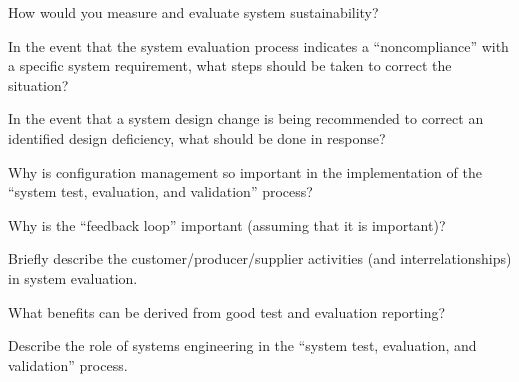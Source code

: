 \begin{exercises}
    \begin{exercise}
    \label{sea-06-13}
        How would you measure and evaluate system sustainability?
    \end{exercise}
    \begin{solution}
    \end{solution}
    
    \begin{exercise}
    \label{sea-06-14}
        In the event that the system evaluation process indicates a “noncompliance” with a specific system requirement, what steps should be taken to correct the situation?
    \end{exercise}
    \begin{solution}
    \end{solution}
    
    \begin{exercise}
    \label{sea-06-15}
        In the event that a system design change is being recommended to correct an identified design deficiency, what should be done in response?
    \end{exercise}
    \begin{solution}
    \end{solution}
    
    \begin{exercise}
    \label{sea-06-16}
        Why is configuration management so important in the implementation of the “system test, evaluation, and validation” process?
    \end{exercise}
    \begin{solution}
    \end{solution}
    
    \begin{exercise}
    \label{sea-06-17}
        Why is the “feedback loop” important (assuming that it is important)?
    \end{exercise}
    \begin{solution}
    \end{solution}
    
    \begin{exercise}
    \label{sea-06-18}
        Briefly describe the customer/producer/supplier activities (and interrelationships) in system evaluation.
    \end{exercise}
    \begin{solution}
    \end{solution}
    
    \begin{exercise}
    \label{sea-06-19}
        What benefits can be derived from good test and evaluation reporting?
    \end{exercise}
    \begin{solution}
    \end{solution}
    
    \begin{exercise}
    \label{sea-06-20}
        Describe the role of systems engineering in the “system test, evaluation, and validation” process.
    \end{exercise}
    \begin{solution}
    \end{solution}
\end{exercises}
